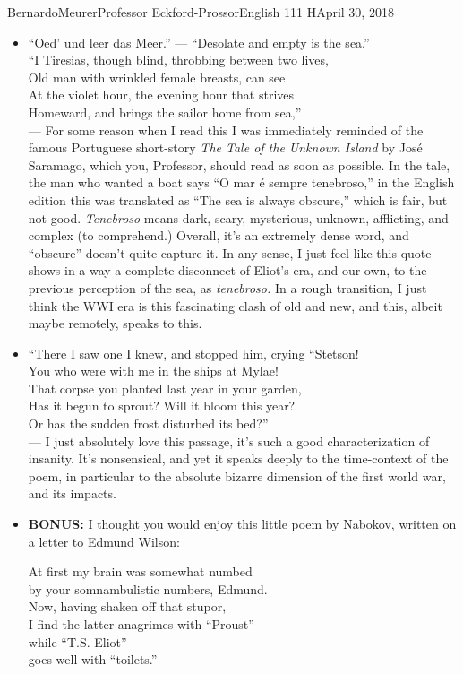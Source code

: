 \documentclass[12pt,letterpaper]{article}
\begin{document}
\begin{mla}{Bernardo}{Meurer}{Professor Eckford-Prossor}{English 111 H}{April 30, 2018}
\begin{itemize}
		\item ``Oed' und leer das Meer.'' --- ``Desolate and empty is the sea.''\\
		      ``I Tiresias, though blind, throbbing between two lives,\\
		      Old man with wrinkled female breasts, can see\\
		      At the violet hour, the evening hour that strives\\
		      Homeward, and brings the sailor home from sea,''\\
		      --- For some reason when I read this I was immediately reminded of the famous Portuguese short-story \textit{The Tale of the Unknown Island} by José Saramago, which you, Professor, should read as soon as possible. In the tale, the man who wanted a boat says ``O mar é sempre tenebroso,'' in the English edition this was translated as ``The sea is always obscure,'' which is fair, but not good. \textit{Tenebroso} means dark, scary, mysterious, unknown, afflicting, and complex (to comprehend.) Overall, it's an extremely dense word, and ``obscure'' doesn't quite capture it. In any sense, I just feel like this quote shows in a way a complete disconnect of Eliot's era, and our own, to the previous perception of the sea, as \textit{tenebroso.} In a rough transition, I just think the WWI era is this fascinating clash of old and new, and this, albeit maybe remotely, speaks to this.
		\item ``There I saw one I knew, and stopped him, crying “Stetson!\\
		      You who were with me in the ships at Mylae!\\
		      That corpse you planted last year in your garden,\\
		      Has it begun to sprout? Will it bloom this year?\\
		      Or has the sudden frost disturbed its bed?''\\
		      --- I just absolutely love this passage, it's such a good characterization of insanity. It's nonsensical, and yet it speaks deeply to the time-context of the poem, in particular to the absolute bizarre dimension of the first world war, and its impacts.

		\item \textbf{BONUS:} I thought you would enjoy this little poem by Nabokov, written on a letter to Edmund Wilson:
		      \begin{blocks}
			      At first my brain was somewhat numbed\\
			      by your somnambulistic numbers, Edmund.\\
			      Now, having shaken off that stupor,\\
			      I find the latter anagrimes with ``Proust''\\
			      while ``T.S. Eliot''\\
			      goes well with ``toilets.''\\
		      \end{blocks}
	\end{itemize}

\end{mla}
\end{document}
